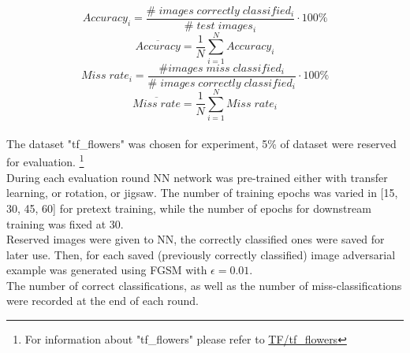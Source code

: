 \begin{equation}
    Accuracy_i = \frac{\# \; images \; correctly \; classified_i}{\# \; test \; images_i} \cdot 100 \%
\end{equation}
\begin{equation}
    \overline{Accuracy} = \frac{1}{N}  \sum_{i=1}^{N}{Accuracy_i}
\end{equation}
\begin{equation}
    Miss \; rate_i = \frac{\# images \; miss \; classified_i}{\# \; images \; correctly \; classified_i} \cdot 100 \%
\end{equation}
\begin{equation}
    \overline{Miss \; rate} = \frac{1}{N}  \sum_{i=1}^{N}{Miss \; rate_i}
\end{equation}
\\
The dataset "tf\_flowers" was chosen for experiment, 5\% of dataset were reserved for evaluation.
\footnote{For information about "tf\_flowers" please refer to \href{https://www.tensorflow.org/datasets/catalog/tf_flowers}{TF/tf\_flowers}}
\\
During each evaluation round NN network was pre-trained either with transfer learning, or rotation, or jigsaw.
The number of training epochs was varied in [15, 30, 45, 60] for pretext training, while the number of epochs for downstream
training was fixed at 30.
\\
Reserved images were given to NN, the correctly classified ones were saved for later use.
Then, for each saved (previously correctly classified) image adversarial example was generated
using FGSM with $\epsilon = 0.01$.
\\
The number of correct classifications, as well as the number of miss-classifications were recorded at the end of each round.
